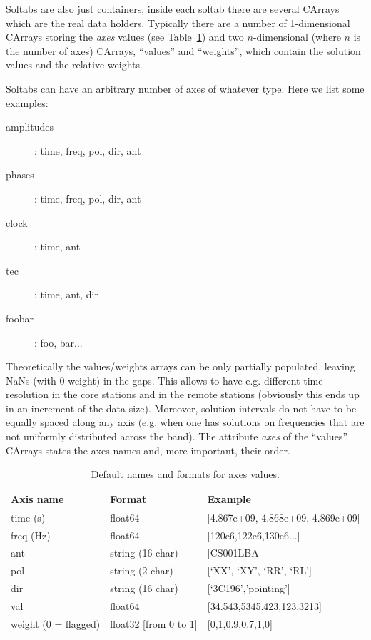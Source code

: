 \documentclass[]{article}
\begin{document}
Soltabs are also just containers; inside each soltab there are several CArrays which are the real data holders. Typically there are a number of 1-dimensional CArrays storing the \textit{axes} values (see Table~\ref{losoto:tab:axes}) and two $n$-dimensional (where $n$ is the number of axes) CArrays, ``values'' and ``weights'', which contain the solution values and the relative weights.

Soltabs can have an arbitrary number of axes of whatever type. Here we list some examples:
\begin{description}
 \item[amplitudes]: time, freq, pol, dir, ant
 \item[phases]: time, freq, pol, dir, ant
 \item[clock]: time, ant
 \item[tec]: time, ant, dir
 \item[foobar]: foo, bar...
\end{description}

Theoretically the values/weights arrays can be only partially populated, leaving NaNs (with 0 weight) in the gaps. This allows to have e.g. different time resolution in the core stations and in the remote stations (obviously this ends up in an increment of the data size). Moreover, solution intervals do not have to be equally spaced along any axis (e.g. when one has solutions on frequencies that are not uniformly distributed across the band). The attribute \textit{axes} of the ``values'' CArrays states the axes names and, more important, their order.

\begin{table}[!h]
\centering
\begin{tabular}{l l l}
\hline
\hline
Axis name & Format & Example\\
\hline
time (s) & float64 & [4.867e+09, 4.868e+09, 4.869e+09] \\
freq (Hz) & float64 & [120e6,122e6,130e6...]\\
ant & string (16 char) & [CS001LBA]\\
pol & string (2 char) & [‘XX’, ‘XY’, ‘RR’, ‘RL’]\\
dir & string (16 char)& [‘3C196’,’pointing’]\\
val & float64 & [34.543,5345.423,123.3213]\\
weight (0 = flagged) & float32 [from 0 to 1] & [0,1,0.9,0.7,1,0]\\
\hline
\end{tabular}
\caption{Default names and formats for axes values. \label{losoto:tab:axes}}
\end{table}
\end{document}
